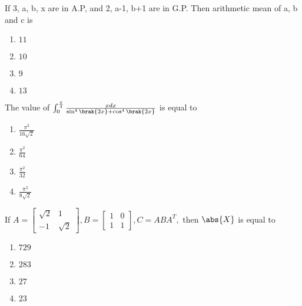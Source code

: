 \iffalse
\title{Assignment}
\author{K.AKSHAY TEJA}
\section{mcq-single}
\fi
\item If 3, a, b, x are in A.P, and 2, a-1, b+1 are in G.P. Then arithmetic mean of a, b and c is   \hfill {}

\begin{multicols}{4}
\begin{enumerate}
    \item $11$
    \item $10$
    \item $9$
    \item $13$
\end{enumerate}
\end{multicols}

\item The value of $\int_0^{\frac{\pi}{4}} \frac{xdx}{\sin ^4\brak{2x} + \cos ^4\brak{2x}}$ is equal to  \hfill {}

\begin{multicols}{4}
\begin{enumerate}
    \item $\frac{\pi ^2}{16\sqrt{2}}$
    \item $\frac{\pi ^2}{64}$
    \item $\frac{\pi ^2}{32}$
    \item $\frac{\pi ^2}{8\sqrt{2}}$
\end{enumerate}
\end{multicols}



\item If $A = \begin{bmatrix}\sqrt{2} & 1\\-1 & \sqrt{2}
\end{bmatrix}, B = \begin{bmatrix} 1 & 0\\1 & 1
\end{bmatrix}, C = ABA^T,$ then $\abs{X}$ is equal to  \hfill {}
\begin{multicols}{4}
\begin{enumerate}
    \item $729$ 
    \item $283$ 
    \item $27$ 
    \item $23$ 
\end{enumerate}
\end{multicols}



